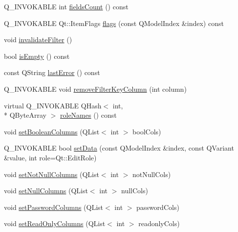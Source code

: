 \begin{DoxyCompactItemize}
\item 
Q\-\_\-\-I\-N\-V\-O\-K\-A\-B\-L\-E int \hyperlink{classSimpleHotel_1_1SH__ExtendedProxyModel_afdfcdd904c8950e5c9ee692736ebe524}{fields\-Count} () const 
\item 
Q\-\_\-\-I\-N\-V\-O\-K\-A\-B\-L\-E Qt\-::\-Item\-Flags \hyperlink{classSimpleHotel_1_1SH__ExtendedProxyModel_a13db609799a6c190772602574d0a8d7a}{flags} (const Q\-Model\-Index \&index) const 
\item 
void \hyperlink{classSimpleHotel_1_1SH__ExtendedProxyModel_ac9bdf77bc05ce34a80652c4fa36f4bc1}{invalidate\-Filter} ()
\item 
bool \hyperlink{classSimpleHotel_1_1SH__ExtendedProxyModel_a6b80c28b89c4977a5462d237e8cb2119}{is\-Empty} () const 
\item 
const Q\-String \hyperlink{classSimpleHotel_1_1SH__ExtendedProxyModel_a2fe3237fc71062037d0e68530e4c18d9}{last\-Error} () const 
\item 
Q\-\_\-\-I\-N\-V\-O\-K\-A\-B\-L\-E void \hyperlink{classSimpleHotel_1_1SH__ExtendedProxyModel_af549f904ee842d516f3cdbe60358a910}{remove\-Filter\-Key\-Column} (int column)
\item 
virtual Q\-\_\-\-I\-N\-V\-O\-K\-A\-B\-L\-E Q\-Hash$<$ int, \\*
Q\-Byte\-Array $>$ \hyperlink{classSimpleHotel_1_1SH__ExtendedProxyModel_a29ce95769b0cf1c2ea394403f1b4cf46}{role\-Names} () const 
\item 
void \hyperlink{classSimpleHotel_1_1SH__ExtendedProxyModel_a65e5c7011b2b31f61bf9a7dddabef27c}{set\-Boolean\-Columns} (Q\-List$<$ int $>$ bool\-Cols)
\item 
Q\-\_\-\-I\-N\-V\-O\-K\-A\-B\-L\-E bool \hyperlink{classSimpleHotel_1_1SH__ExtendedProxyModel_a94775c043450518596dab93676149b90}{set\-Data} (const Q\-Model\-Index \&index, const Q\-Variant \&value, int role=Qt\-::\-Edit\-Role)
\item 
void \hyperlink{classSimpleHotel_1_1SH__ExtendedProxyModel_a0136908081b4423eb0ddd5781654f65d}{set\-Not\-Null\-Columns} (Q\-List$<$ int $>$ not\-Null\-Cols)
\item 
void \hyperlink{classSimpleHotel_1_1SH__ExtendedProxyModel_adf6a9faa540bda5bb7bbe9040fafc667}{set\-Null\-Columns} (Q\-List$<$ int $>$ null\-Cols)
\item 
void \hyperlink{classSimpleHotel_1_1SH__ExtendedProxyModel_a4a3cc4b9dfceb14bfd71770a7189f686}{set\-Password\-Columns} (Q\-List$<$ int $>$ password\-Cols)
\item 
void \hyperlink{classSimpleHotel_1_1SH__ExtendedProxyModel_a452dd45c56f8cfde44e1261b597f169b}{set\-Read\-Only\-Columns} (Q\-List$<$ int $>$ readonly\-Cols)

\end{DoxyCompactItemize}
